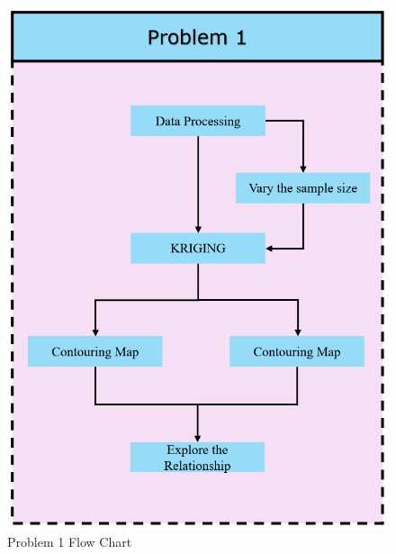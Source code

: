 \documentclass{swmcmthesis}
\begin{document}
\begin{figure}[h!t]
	\centering
	\begin{minipage}[t]{0.4\textwidth}
		\centering
		\includegraphics[width=\textwidth]{Problem 1.png}
		\caption{Problem 1 Flow Chart}
	\end{minipage}
	\hfill
	\begin{minipage}[t]{0.4\textwidth}
		\centering

\end{minipage}
\end{figure}
\end{document}
